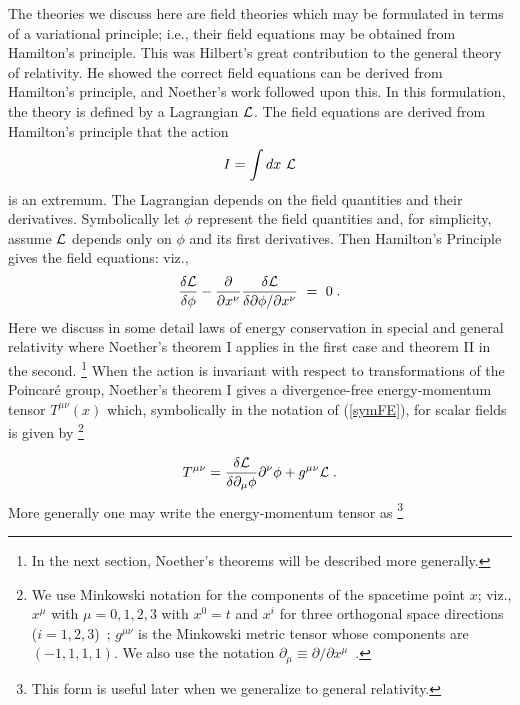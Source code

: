 The theories we discuss here  are field theories which may be formulated in
terms of a variational principle; i.e., their field 
 equations may be obtained from Hamilton's principle.
This was Hilbert's great contribution to the general theory of relativity. He showed the correct field equations can be derived from  Hamilton's 
principle, and   Noether's work followed upon this. 
In this formulation, the theory is defined by a Lagrangian $\cal{L}$. The
field equations are derived from Hamilton's principle that the action
\begin{equation} 
I = \int dx ~\cal{L} \label{act}
\end{equation}
is an extremum. The Lagrangian depends on the field quantities and their
derivatives. Symbolically let $\phi$ represent the field quantities and,
for simplicity,
 assume $\cal{L}$ depends only on $\phi$ and its first derivatives.
Then Hamilton's Principle gives 
 the field equations: viz.,  
 \begin{equation} {\delta {\cal{L}}
\over \delta \phi} - {\partial \over \partial x^\nu}{\delta{\cal{L}} \over
\delta\partial \phi/\partial x^\nu } ~ = ~ 0 \; .  \label{symFE} 
\end{equation}
Here we discuss in some detail laws of energy
conservation in special and general relativity where Noether's theorem I
applies in the first case and theorem II in the second. \footnote{
 In the next section, Noether's
theorems  will be described more generally.}
 When the action is invariant with respect to 
transformations of the Poincar\'{e} 
group,   Noether's theorem I gives a divergence-free
 energy-momentum  tensor $T^{\mu\nu}(x)$ which, symbolically in the notation of 
  (\ref{symFE}), for scalar fields is given by 
\footnote{ We use Minkowski notation for the components
of the spacetime point $x$; viz., $x^\mu$ with $\mu = 0, 1, 2, 3$ with $x^0 = t$
and $x^i$ for three orthogonal space directions ($ i = 1, 2, 3$)~;
 $g^{\mu\nu}$ is the Minkowski metric tensor whose components are 
$(-1, 1, 1, 1)$. We also use the notation $\partial_{\mu} \equiv \partial / 
\partial x^\mu $~.} 

\begin{equation}
T^{\mu\nu} = {\delta {\cal{L}}\over \delta \partial_{\mu} \phi} \partial^\nu 
\phi + g^{\mu\nu} {\cal{L}}\; .  \label{Tmunu} 
\end{equation}
More generally one may write the energy-momentum tensor as
\footnote{This form is useful  later when we generalize to general relativity.}

